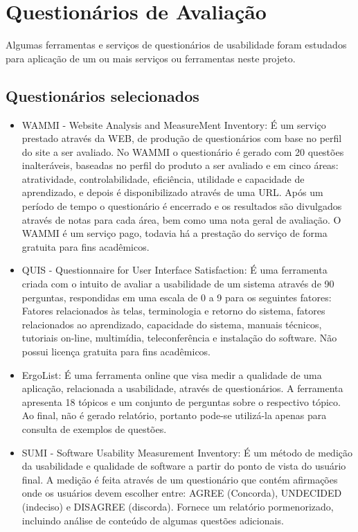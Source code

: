 \chapter{Questionários de Avaliação}
\label{questionarios}

Algumas ferramentas e serviços de questionários de usabilidade foram estudados para aplicação de um ou mais serviços ou ferramentas neste projeto.

\section{Questionários selecionados}
\begin{itemize}
 \item WAMMI - Website Analysis and MeasureMent Inventory: É um serviço prestado através da WEB, de produção de questionários com base no perfil do site a ser avaliado. 
 No WAMMI o questionário é gerado com 20 questões inalteráveis, baseadas no perfil do produto a ser avaliado e em cinco áreas: atratividade, controlabilidade, eficiência, 
 utilidade e capacidade de aprendizado, e depois é disponibilizado através de uma URL. Após um período de tempo o questionário é encerrado e os resultados são divulgados 
 através de notas para cada área, bem como uma nota geral de avaliação. O WAMMI é um serviço pago, todavia há a prestação do serviço de forma gratuita para fins acadêmicos. 

 \item QUIS - Questionnaire for User Interface Satisfaction: É uma ferramenta criada com o intuito de avaliar a usabilidade de um sistema através de 90 perguntas,
 respondidas em uma escala de 0 a 9 para os seguintes fatores: Fatores relacionados às telas, terminologia e retorno do sistema, fatores relacionados ao aprendizado, 
 capacidade do sistema, manuais técnicos, tutoriais on-line, multimídia, teleconferência e instalação do software. Não possui licença gratuita para fins acadêmicos.

 \item ErgoList: É uma ferramenta online que visa medir a qualidade de uma aplicação, relacionada a usabilidade, através de questionários. 
 A ferramenta apresenta 18 tópicos e um conjunto de perguntas sobre o respectivo tópico. Ao final, não é gerado relatório, portanto pode-se utilizá-la 
 apenas para consulta de exemplos de questões. 
 
 \item SUMI - Software Usability Measurement Inventory: É um método de medição da usabilidade e qualidade de software a partir do ponto de vista do usuário final.
 A medição é feita através de um questionário que contém afirmações onde os usuários devem escolher entre: AGREE (Concorda), UNDECIDED (indeciso) e DISAGREE (discorda). 
 Fornece um relatório pormenorizado, incluindo análise de conteúdo de algumas questões adicionais. 


\end{itemize}
